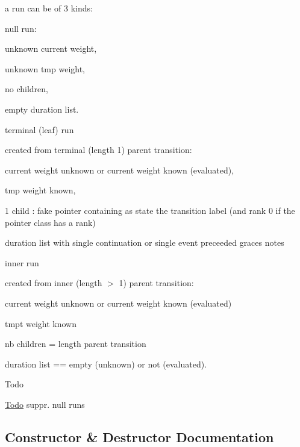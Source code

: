 a run can be of 3 kinds\+:
\begin{DoxyItemize}
\item null run\+:
\begin{DoxyItemize}
\item unknown current weight,
\item unknown tmp weight,
\item no children,
\item empty duration list.
\end{DoxyItemize}
\item terminal (leaf) run
\begin{DoxyItemize}
\item created from terminal (length 1) parent transition\+:
\item current weight unknown or current weight known (evaluated),
\item tmp weight known,
\item 1 child \+: fake pointer containing as state the transition label (and rank 0 if the pointer class has a rank)
\item duration list with single continuation or single event preceeded graces notes
\end{DoxyItemize}
\item inner run
\begin{DoxyItemize}
\item created from inner (length $>$ 1) parent transition\+:
\item current weight unknown or current weight known (evaluated)
\item tmpt weight known
\item nb children = length parent transition
\item duration list == empty (unknown) or not (evaluated).
\end{DoxyItemize}

\begin{DoxyRefDesc}{Todo}
\item[\mbox{\hyperlink{todo__todo000035}{Todo}}]suppr. null runs \end{DoxyRefDesc}

\end{DoxyItemize}

\subsection{Constructor \& Destructor Documentation}
\mbox{\label{classRun_a63172061ee2c7c601f13d4ef3f3a67bd}} 
